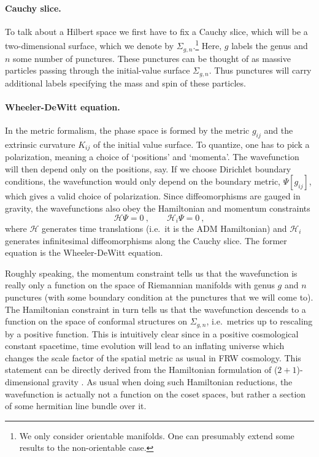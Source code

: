 \documentclass[12pt,a4paper]{article}
\newcommand{\be}{\begin{equation}}
\newcommand{\ee}{\end{equation}}
\begin{document}
\paragraph{Cauchy slice.} To talk about a Hilbert space we first have to fix a Cauchy slice, which will be a two-dimensional surface, which we denote by $\Sigma_{g,n}$.\footnote{We only consider orientable manifolds. One can presumably extend some results to the non-orientable case.}
Here, $g$ labels the genus and $n$ some number of punctures. These punctures can be thought of as massive particles passing through the initial-value surface $\Sigma_{g,n}$. Thus punctures will carry additional labels specifying the mass and spin of these particles. 



\paragraph{Wheeler-DeWitt equation.} In the metric formalism, the phase space is formed by the metric $g_{ij}$ and the extrinsic curvature $K_{ij}$ of the initial value surface. To quantize, one has to pick a polarization, meaning a choice of `positions' and `momenta'. The wavefunction will then depend only on the positions, say. If we choose Dirichlet boundary conditions, the wavefunction would only depend on the boundary metric, $\Psi[g_{ij}]$, which gives a valid choice of polarization. Since diffeomorphisms are gauged in gravity, the wavefunctions also obey the Hamiltonian and momentum constraints
\be 
\mathcal{H} \Psi=0~, \qquad \mathcal{H}_i \Psi=0~, \label{eq:WdW equation}
\ee
where $\mathcal{H}$ generates time translations (i.e.\ it is the ADM Hamiltonian) and $\mathcal{H}_i$ generates infinitesimal diffeomorphisms along the Cauchy slice. The former equation is the Wheeler-DeWitt equation.

Roughly speaking, the momentum constraint tells us that the wavefunction is really only a function on the space of Riemannian manifolds with genus $g$ and $n$ punctures (with some boundary condition at the punctures that we will come to). The Hamiltonian constraint in turn tells us that the wavefunction descends to a function on the space of conformal structures on $\Sigma_{g,n}$, i.e.\ metrics up to rescaling by a positive function. This is intuitively clear since in a positive cosmological constant spacetime, time evolution will lead to an inflating universe which changes the scale factor of the spatial metric as usual in FRW cosmology. This statement can be directly derived from the Hamiltonian formulation of ($2{+}1$)-dimensional gravity \cite{Moncrief:1989dx, Krasnov:2005dm}. As usual when doing such Hamiltonian reductions, the wavefunction is actually not a function on the coset spaces, but rather a section of some hermitian line bundle over it.
\end{document}
